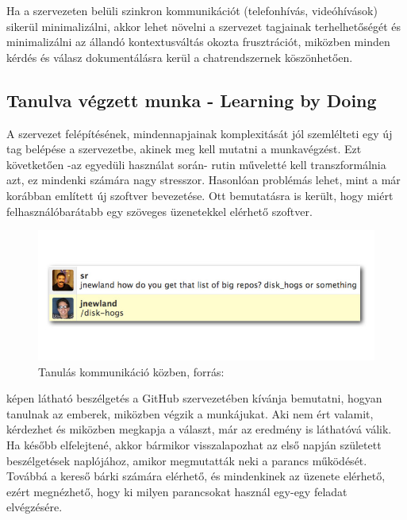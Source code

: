 Ha a szervezeten belüli szinkron kommunikációt (telefonhívás, videóhívások) sikerül minimalizálni, akkor lehet növelni a szervezet tagjainak terhelhetőségét és minimalizálni az állandó kontextusváltás okozta frusztrációt, miközben minden kérdés és válasz dokumentálásra kerül a chatrendszernek köszönhetően.

\subsection*{Tanulva végzett munka - Learning by Doing}
A szervezet felépítésének, mindennapjainak komplexitását jól szemlélteti egy új tag belépése a szervezetbe, akinek meg kell mutatni a munkavégzést. Ezt követketően -az egyedüli használat során- rutin műveletté kell transzformálnia azt, ez mindenki számára nagy stresszor. Hasonlóan problémás lehet, mint a már korábban említett új szoftver bevezetése. Ott bemutatásra is került, hogy miért felhasználóbarátabb egy szöveges üzenetekkel elérhető szoftver.

\begin{figure}[H]
  \centering
    \includegraphics[scale=.6]{assets/github_disk_how_is_it.png}%
    \caption[DUMMY]%
    {Tanulás kommunikáció közben, forrás: \cite[p.~65]{what_is_chatops_slideshow}}%
    \label{fig:learn_by_doing}
\end{figure}

 képen látható beszélgetés a GitHub szervezetében kívánja bemutatni, hogyan tanulnak az emberek, miközben végzik a munkájukat. Aki nem ért valamit, kérdezhet és miközben megkapja a választ, már az eredmény is láthatóvá válik. Ha később elfelejtené, akkor bármikor visszalapozhat az első napján született beszélgetések naplójához, amikor megmutatták neki a parancs működését. Továbbá a kereső bárki számára elérhető, és mindenkinek az üzenete elérhető, ezért megnézhető, hogy ki milyen parancsokat használ egy-egy feladat elvégzésére.

